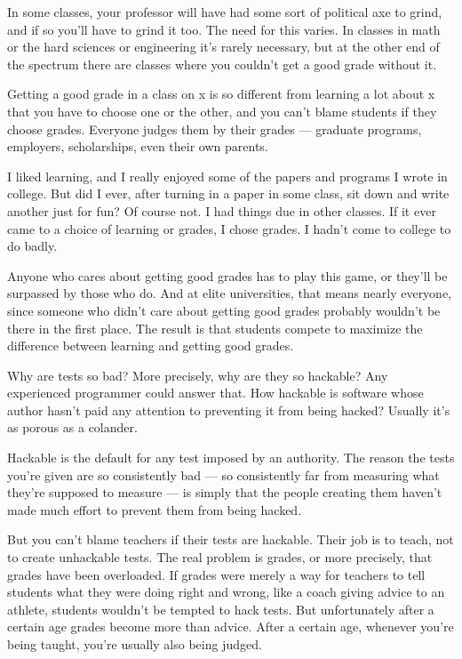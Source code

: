 In some classes, your professor will have had some sort of political axe
to grind, and if so you'll have to grind it too. The need for this
varies. In classes in math or the hard sciences or engineering it's
rarely necessary, but at the other end of the spectrum there are classes
where you couldn't get a good grade without it.

Getting a good grade in a class on x is so different from learning a lot
about x that you have to choose one or the other, and you can't blame
students if they choose grades. Everyone judges them by their grades ---
graduate programs, employers, scholarships, even their own parents.

I liked learning, and I really enjoyed some of the papers and programs I
wrote in college. But did I ever, after turning in a paper in some
class, sit down and write another just for fun? Of course not. I had
things due in other classes. If it ever came to a choice of learning or
grades, I chose grades. I hadn't come to college to do badly.

Anyone who cares about getting good grades has to play this game, or
they'll be surpassed by those who do. And at elite universities, that
means nearly everyone, since someone who didn't care about getting good
grades probably wouldn't be there in the first place. The result is that
students compete to maximize the difference between learning and getting
good grades.

Why are tests so bad? More precisely, why are they so hackable? Any
experienced programmer could answer that. How hackable is software whose
author hasn't paid any attention to preventing it from being hacked?
Usually it's as porous as a colander.

Hackable is the default for any test imposed by an authority. The reason
the tests you're given are so consistently bad --- so consistently far
from measuring what they're supposed to measure --- is simply that the
people creating them haven't made much effort to prevent them from being
hacked.

But you can't blame teachers if their tests are hackable. Their job is
to teach, not to create unhackable tests. The real problem is grades, or
more precisely, that grades have been overloaded. If grades were merely
a way for teachers to tell students what they were doing right and
wrong, like a coach giving advice to an athlete, students wouldn't be
tempted to hack tests. But unfortunately after a certain age grades
become more than advice. After a certain age, whenever you're being
taught, you're usually also being judged.

